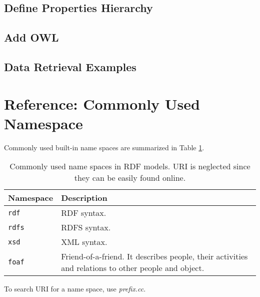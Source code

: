 \subsection{Define Properties Hierarchy}

\subsection{Add OWL}

\subsection{Data Retrieval Examples}

\section{Reference: Commonly Used Namespace}

Commonly used built-in name spaces are summarized in Table \ref{tab:commonnamespace}.

\begin{table}
	\centering \caption{Commonly used name spaces in RDF models. URI is neglected since they can be easily found online.} \label{tab:commonnamespace}
	\begin{tabularx}{\textwidth}{lX}
		\hline
		Namespace & Description \\ \hline
		\verb|rdf| & RDF syntax. \\
		\verb|rdfs| & RDFS syntax. \\
		\verb|xsd|  & XML syntax. \\
		\verb|foaf| & Friend-of-a-friend. It describes people, their activities and relations to other people and object. \\
		\hline
	\end{tabularx}
\end{table}

To search URI for a name space, use \textit{prefix.cc}.





























